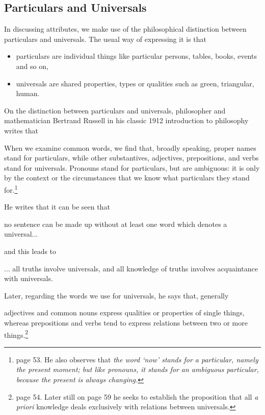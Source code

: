 \subsection{Particulars and Universals}  
\mynote 
In discussing attributes, we make use of the philosophical distinction between particulars and universals. 
The usual way of expressing it is that 
\begin{itemize}
\item	particulars are individual things like particular persons, tables, books, events and so on, 
\item universals are shared properties, types or qualities such as green, triangular, human.
\end{itemize}
\mynote 
On the distinction between particulars and universals, philosopher and mathematician Bertrand Russell in his classic 1912 introduction to philosophy
writes that
\begin{erquote}
When we examine common words, we find that, broadly speaking, proper names stand for particulars, while other substantives, adjectives, prepositions, and verbs stand for universals. Pronouns stand for particulars, but are ambiguous: it is only by the context or the circumstances that we know what particulars they stand for.\footnote{page 53. He also observes that
\textit{the word `now' stands for a particular, namely the present moment; but like pronouns, it stands for an ambiguous particular, because the present is always changing.}}
\end{erquote}

He writes that it can be seen that
\begin{erquote}
 no sentence can be made up without at least one word which denotes a universal...
\end{erquote}
and this  leads to 
\begin{erquote}
... all truths involve universals, and all knowledge of truths involves acquaintance with universals.
\end{erquote}
Later, regarding the words we use for universals, he says that, generally
\begin{erquote}
adjectives and common nouns express qualities or properties of single things, whereas prepositions and verbs tend to express relations between two or more things.\footnote{page 54. Later still on page 59 he seeks to establish the proposition that
all \textit{a priori} knowledge deals exclusively with relations between universals.
}
\end{erquote}


